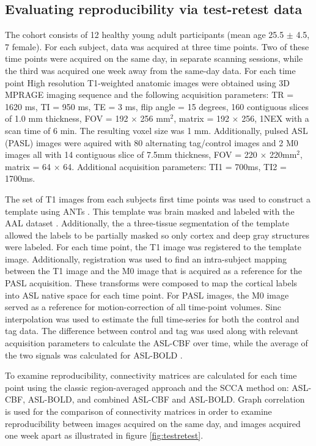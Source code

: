 \documentclass{llncs}
\begin{document}
\subsection{Evaluating reproducibility via test-retest data}
 The cohort consists of 12 healthy young adult participants  (mean age 25.5 $\pm$ 4.5, 7 female). For each subject, data was acquired at three time points. Two of these time points were acquired on the same day, in separate scanning sessions, while the third was acquired one week away from the same-day data.  For each time point High resolution T1-weighted anatomic images were obtained using 3D MPRAGE imaging sequence and the following acquisition parameters: TR = 1620 ms, TI = 950 ms, TE = 3 ms, flip angle = 15 degrees, 160 contiguous slices of 1.0 mm thickness, FOV = 192 $\times$ 256 mm$^2$, matrix = 192 $\times$ 256, 1NEX with a scan time of 6 min. The resulting voxel size was 1 mm.  Additionally, pulsed ASL (PASL) images were aquired with 80 alternating tag/control images and 2 M0 images all with 14 contiguous slice of 7.5mm thickness, FOV = 220 $\times$ 220mm$^2$, matrix = 64 $\times$ 64. Additional acquisition parameters: TI1 = 700ms, TI2 = 1700ms.

 The set of T1 images from each subjects first time points was used to construct a template using ANTs \cite{Avants2011}. This template was brain masked and labeled with the AAL dataset \cite{Tzourio-Mazoyer2002}. Additionally, the a three-tissue segmentation of the template allowed the labels to be partially masked so only cortex and deep gray structures were labeled. For each time point, the T1 image was registered to the template image. Additionally, registration was used to find an intra-subject mapping between the T1 image and the M0 image that is acquired as a reference for the PASL acquisition. These transforms were composed to map the cortical labels into ASL native space for each time point. For PASL images, the M0 image served as a reference for motion-correction of all time-point volumes. Sinc interpolation was used to estimate the full time-series for both the control and tag data. The difference between control and tag was used along with relevant acquisition parameters to calculate the ASL-CBF over time, while the average of the two signals was calculated for ASL-BOLD \cite{Wong1997}. 

 To examine reproducibility, connectivity matrices are calculated for each time point using the classic region-averaged approach and the SCCA method on: ASL-CBF, ASL-BOLD, and combined ASL-CBF and ASL-BOLD. Graph correlation \cite{vanWijk2010} is used for the comparison of connectivity matrices in order to examine reproducibility between images acquired on the same day, and images acquired one week apart as illustrated in figure \ref{fig:testretest}.
\end{document}
